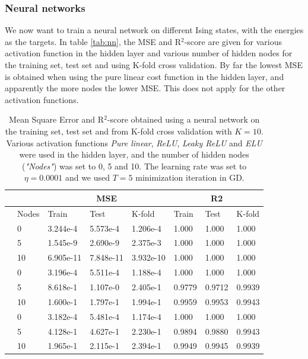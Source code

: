 \subsubsection{Neural networks}
We now want to train a neural network on different Ising states, with the energies as the targets. In table \eqref{tab:nn}, the MSE and R$^2$-score are given for various activation function in the hidden layer and various number of hidden nodes for the training set, test set and using K-fold cross validation. By far the lowest MSE is obtained when using the pure linear cost function in the hidden layer, and apparently the more nodes the lower MSE. This does not apply for the other activation functions. 
\begin{table} [H]
	\caption{Mean Square Error and R$^2$-score obtained using a neural network on the training set, test set and from K-fold cross validation with $K=10$. Various activation functions \textit{Pure linear}, \textit{ReLU}, \textit{Leaky ReLU} and \textit{ELU} were used in the hidden layer, and the number of hidden nodes (\textit{"Nodes"}) was set to 0, 5 and 10. The learning rate was set to $\eta=0.0001$ and we used $T=5$ minimization iteration in GD.}
	\begin{tabularx}{\textwidth}{l|l|XXX|XXX} \hline\hline
		\label{tab:nn}
		&& \multicolumn{3}{c}{\textbf{MSE}}&\multicolumn{3}{c}{\textbf{R2}}\\ \hline
		&Nodes&Train&Test&K-fold&Train&Test&K-fold\\ \hline
		
		\parbox[t]{2mm}{}
		&0 & 3.244e-4 & 5.573e-4 & 1.206e-4 & 1.000 & 1.000 & 1.000\\
		&5 & 1.545e-9 & 2.690e-9 & 2.375e-3 & 1.000 & 1.000 & 1.000 \\
		&10 & 6.905e-11 & 7.848e-11 & 3.932e-10 & 1.000 & 1.000 & 1.000\\ \hline
		
		\parbox[t]{2mm}{}
		&0 & 3.196e-4 & 5.511e-4 & 1.188e-4 & 1.000 & 1.000 & 1.000 \\
		&5 & 8.618e-1 & 1.107e-0 & 2.405e-1 & 0.9779 & 0.9712 & 0.9939 \\
		&10 & 1.600e-1 & 1.797e-1 & 1.994e-1 & 0.9959 & 0.9953 & 0.9943\\ \hline
		
		\parbox[t]{2mm}{}
		&0 & 3.182e-4 & 5.481e-4 & 1.174e-4 & 1.000 & 1.000 & 1.000 \\
		&5 & 4.128e-1 & 4.627e-1 & 2.230e-1 & 0.9894 & 0.9880 & 0.9943\\
		&10 & 1.965e-1 & 2.115e-1 & 2.394e-1 & 0.9949 & 0.9945 & 0.9939\\ \hline
		

\end{tabularx}
\end{table}
